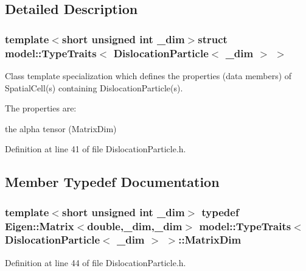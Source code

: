 \subsection{Detailed Description}
\subsubsection*{template$<$short unsigned int \+\_\+dim$>$struct model\+::\+Type\+Traits$<$ Dislocation\+Particle$<$ \+\_\+dim $>$ $>$}

Class template specialization which defines the properties (data members) of Spatial\+Cell(s) containing Dislocation\+Particle(s). 

The properties are\+:
\begin{DoxyItemize}
\item the alpha tensor (Matrix\+Dim) 
\end{DoxyItemize}

Definition at line 41 of file Dislocation\+Particle.\+h.



\subsection{Member Typedef Documentation}
\hypertarget{structmodel_1_1_type_traits_3_01_dislocation_particle_3_01__dim_01_4_01_4_a4c1e76161c4bb074e8c6c91e13d4b15b}{}
\subsubsection[{Matrix\+Dim}]{\setlength{\rightskip}{0pt plus 5cm}template$<$short unsigned int \+\_\+dim$>$ typedef Eigen\+::\+Matrix$<$double,\+\_\+dim,\+\_\+dim$>$ {\bf model\+::\+Type\+Traits}$<$ {\bf Dislocation\+Particle}$<$ \+\_\+dim $>$ $>$\+::{\bf Matrix\+Dim}}\label{structmodel_1_1_type_traits_3_01_dislocation_particle_3_01__dim_01_4_01_4_a4c1e76161c4bb074e8c6c91e13d4b15b}


Definition at line 44 of file Dislocation\+Particle.\+h.

\hypertarget{structmodel_1_1_type_traits_3_01_dislocation_particle_3_01__dim_01_4_01_4_a1b88c1eb32da1009c672f388a3a38fc9}{}
